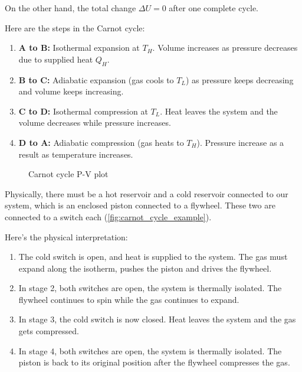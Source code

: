 \documentclass[12pt,chapterprefix=false,dvipsnames]{scrbook}
\theoremstyle{dotless}
\theoremstyle{definition}
\begin{document}
On the other hand, the total change $\Delta U = 0$
after one complete cycle.

Here are the steps in the Carnot cycle:
\begin{enumerate}
	\item \textbf{A to B:} Isothermal expansion at
	      $T_H$. Volume increases
	      as pressure decreases due to supplied heat
	      $Q_H$.
	\item \textbf{B to C:} Adiabatic expansion (gas cools to
	      $T_L$) as
	      pressure keeps decreasing and volume keeps increasing.
	\item \textbf{C to D:} Isothermal compression at
	      $T_L$. Heat leaves
	      the system and the volume decreases while pressure increases.
	\item \textbf{D to A:} Adiabatic compression (gas heats to
	      $T_H$).
	      Pressure increase as a result as temperature increases.
\end{enumerate}

\begin{figure}[htpb]
	\centering
	
	\caption{Carnot cycle P-V plot}%
	\label{fig:carnot_cycle}
\end{figure}

Physically, there must be a hot reservoir and a cold reservoir
connected to our system, which is an enclosed piston connected
to a flywheel. These two are connected to a switch each
(\ref{fig:carnot_cycle_example}).

Here's the physical interpretation:
\begin{enumerate}
	\item The cold switch is open, and heat is supplied to the system. The
	      gas must expand along the isotherm, pushes the piston and drives
	      the flywheel.

	\item In stage 2, both switches are open, the system is thermally
	      isolated. The flywheel continues to spin while the gas continues
	      to expand.

	\item In stage 3, the cold switch is now closed. Heat leaves the
	      system and the gas gets compressed.

	\item In stage 4, both switches are open, the system is thermally
	      isolated. The piston is back to its original position after the
	      flywheel compresses the gas.
\end{enumerate}
\end{document}
